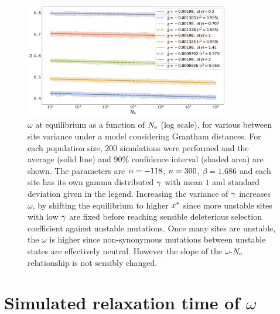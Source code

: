 \documentclass{article}
\begin{document}
\begin{figure}[H]
    \centering
    \includegraphics[width=0.8\textwidth] {SimuStab-GammaStd-Elasticity.pdf}
    \caption[Effect of site variance on the susceptibility without Grantham distance]{
    $\omega$ at equilibrium as a function of $N_{\text{e}}$ (log scale), for various between site variance under a model considering Grantham distances.
    For each population size, $200$ simulations were performed and the average (solid line) and $90\%$ confidence interval (shaded area) are shown.
    The parameters are $\alpha=-118$, $n=300$, $\beta=1.686$ and each site has its own gamma distributed $\gamma$ with mean $1$ and standard deviation given in the legend.
    Increasing the variance of $\gamma$ increases $\omega$, by shifting the equilibrium to higher $x^{*}$ since more unstable sites with low $\gamma$ are fixed before reaching sensible deleterious selection coefficient against unstable mutations. Once many sites are unstable, the $\omega$ is higher since {non-synonymous} mutations between unstable states are effectively {neutral}. However the slope of the $\omega$-$N_{\text{e}}$ relationship is not sensibly changed.
    }
\end{figure}


\section{Simulated relaxation time of \texorpdfstring{$\omega$}{ω}}
\label{sec:simulated-relaxation-time-of-omega}
\end{document}
